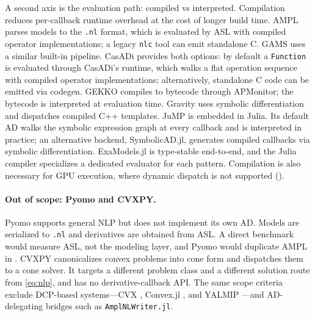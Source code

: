 \documentclass[11pt]{article}
\begin{document}
A second axis is the evaluation path: compiled vs interpreted. Compilation reduces per-callback runtime overhead at the cost of longer build time. AMPL parses models to the \texttt{.nl} format, which is evaluated by ASL with compiled operator implementations; a legacy \texttt{nlc} tool can emit standalone C. GAMS uses a similar built-in pipeline. CasADi provides both options: by default a \texttt{Function} is evaluated through CasADi's runtime, which walks a flat operation sequence with compiled operator implementations; alternatively, standalone C code can be emitted via codegen. GEKKO compiles to bytecode through APMonitor; the bytecode is interpreted at evaluation time. Gravity uses symbolic differentiation and dispatches compiled C++ templates. JuMP is embedded in Julia. Its default AD walks the symbolic expression graph at every callback and is interpreted in practice; an alternative backend, SymbolicAD.jl, generates compiled callbacks via symbolic differentiation. ExaModels.jl is type-stable end-to-end, and the Julia compiler specializes a dedicated evaluator for each pattern. Compilation is also necessary for GPU execution, where dynamic dispatch is not supported ().

\paragraph{Out of scope: Pyomo and CVXPY.}
Pyomo \citep{hartPyomoModelingSolving2011,hartPyomoOptimizationModeling2017} supports general NLP but does not implement its own AD. Models are serialized to \texttt{.nl} and derivatives are obtained from ASL. A direct benchmark would measure ASL, not the modeling layer, and Pyomo would duplicate AMPL in . CVXPY \citep{diamondCVXPYPythonEmbeddedModeling2016} canonicalizes convex problems into cone form and dispatches them to a cone solver. It targets a different problem class and a different solution route from \cref{eq:nlp}, and has no derivative-callback API. The same scope criteria exclude DCP-based systems---CVX \citep{grantCVXMATLABSoftware2014}, Convex.jl \citep{udellConvexOptimizationJulia2014}, and YALMIP \citep{lofbergYALMIPToolboxModeling2004}---and AD-delegating bridges such as \texttt{AmplNLWriter.jl}.
\end{document}

